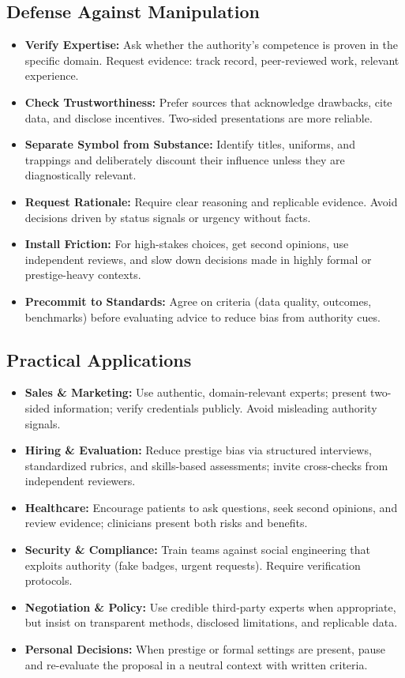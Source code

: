 \subsection*{Defense Against Manipulation}
\begin{itemize}
    \item \textbf{Verify Expertise:} Ask whether the authority’s competence is proven in the specific domain. Request evidence: track record, peer-reviewed work, relevant experience.
    \item \textbf{Check Trustworthiness:} Prefer sources that acknowledge drawbacks, cite data, and disclose incentives. Two-sided presentations are more reliable.
    \item \textbf{Separate Symbol from Substance:} Identify titles, uniforms, and trappings and deliberately discount their influence unless they are diagnostically relevant.
    \item \textbf{Request Rationale:} Require clear reasoning and replicable evidence. Avoid decisions driven by status signals or urgency without facts.
    \item \textbf{Install Friction:} For high-stakes choices, get second opinions, use independent reviews, and slow down decisions made in highly formal or prestige-heavy contexts.
    \item \textbf{Precommit to Standards:} Agree on criteria (data quality, outcomes, benchmarks) before evaluating advice to reduce bias from authority cues.
\end{itemize}

\subsection*{Practical Applications}
\begin{itemize}
    \item \textbf{Sales \& Marketing:} Use authentic, domain-relevant experts; present two-sided information; verify credentials publicly. Avoid misleading authority signals.
    \item \textbf{Hiring \& Evaluation:} Reduce prestige bias via structured interviews, standardized rubrics, and skills-based assessments; invite cross-checks from independent reviewers.
    \item \textbf{Healthcare:} Encourage patients to ask questions, seek second opinions, and review evidence; clinicians present both risks and benefits.
    \item \textbf{Security \& Compliance:} Train teams against social engineering that exploits authority (fake badges, urgent requests). Require verification protocols.
    \item \textbf{Negotiation \& Policy:} Use credible third-party experts when appropriate, but insist on transparent methods, disclosed limitations, and replicable data.
    \item \textbf{Personal Decisions:} When prestige or formal settings are present, pause and re-evaluate the proposal in a neutral context with written criteria.
\end{itemize}
